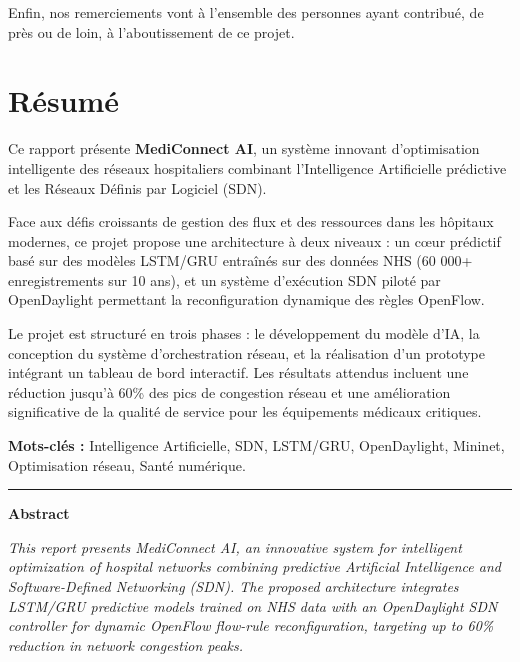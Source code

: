 \documentclass[12pt,a4paper]{article}
\begin{document}
Enfin, nos remerciements vont à l'ensemble des personnes ayant contribué, de près ou de loin, à l'aboutissement de ce projet.

\newpage
\section*{Résumé}

Ce rapport présente \textbf{MediConnect AI}, un système innovant d'optimisation intelligente des réseaux hospitaliers combinant l'Intelligence Artificielle prédictive et les Réseaux Définis par Logiciel (SDN).

Face aux défis croissants de gestion des flux et des ressources dans les hôpitaux modernes, ce projet propose une architecture à deux niveaux : un cœur prédictif basé sur des modèles LSTM/GRU entraînés sur des données NHS (60 000+ enregistrements sur 10 ans), et un système d'exécution SDN piloté par OpenDaylight permettant la reconfiguration dynamique des règles OpenFlow.

Le projet est structuré en trois phases : le développement du modèle d'IA, la conception du système d'orchestration réseau, et la réalisation d'un prototype intégrant un tableau de bord interactif. Les résultats attendus incluent une réduction jusqu'à 60\% des pics de congestion réseau et une amélioration significative de la qualité de service pour les équipements médicaux critiques.

\vspace{0.5cm}
\noindent\textbf{Mots-clés :} Intelligence Artificielle, SDN, LSTM/GRU, OpenDaylight, Mininet, Optimisation réseau, Santé numérique.

\vspace{0.5cm}
\hrule
\vspace{0.3cm}
\noindent\textbf{Abstract}

\textit{This report presents MediConnect AI, an innovative system for intelligent optimization of hospital networks combining predictive Artificial Intelligence and Software-Defined Networking (SDN). The proposed architecture integrates LSTM/GRU predictive models trained on NHS data with an OpenDaylight SDN controller for dynamic OpenFlow flow-rule reconfiguration, targeting up to 60\% reduction in network congestion peaks.}

\newpage
\tableofcontents
{}

\newpage
\listoffigures
{}
\end{document}
